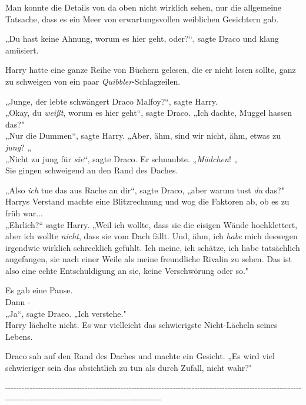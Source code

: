 {Man konnte die Details von da oben nicht wirklich sehen, nur die allgemeine Tatsache, dass es ein Meer von erwartungsvollen weiblichen Gesichtern gab.

„Du hast keine Ahnung, worum es hier geht, oder?“, sagte Draco und klang amüsiert.

Harry hatte eine ganze Reihe von Büchern gelesen, die er nicht lesen sollte, ganz zu schweigen von ein paar \emph{Quibbler}-Schlagzeilen.

„Junge, der lebte schwängert Draco Malfoy?“, sagte Harry.\\ „Okay, du \emph{weißt}, worum es hier geht“, sagte Draco. „Ich dachte, Muggel hassen das?"\\ „Nur die Dummen“, sagte Harry. „Aber, ähm, sind wir nicht, ähm, etwas zu \emph{jung}? „\\ „Nicht zu jung für \emph{sie}“, sagte Draco. Er schnaubte. „\emph{Mädchen}! „\\ Sie gingen schweigend an den Rand des Daches.

„Also \emph{ich} tue das aus Rache an dir“, sagte Draco, „aber warum tust \emph{du} das?"\\ Harrys Verstand machte eine Blitzrechnung und wog die Faktoren ab, ob es zu früh war...\\ „Ehrlich?“ sagte Harry. „Weil ich wollte, dass sie die eisigen Wände hochklettert, aber ich wollte \emph{nicht}, dass sie vom Dach fällt. Und, ähm, ich \emph{habe} mich deswegen irgendwie wirklich schrecklich gefühlt. Ich meine, ich schätze, ich habe tatsächlich angefangen, sie nach einer Weile als meine freundliche Rivalin zu sehen. Das ist also eine echte Entschuldigung an sie, keine Verschwörung oder so."

Es gab eine Pause.\\ Dann -\\ „Ja“, sagte Draco. „Ich verstehe."\\ Harry lächelte nicht. Es war vielleicht das schwierigste Nicht-Lächeln seines Lebens.

Draco sah auf den Rand des Daches und machte ein Gesicht. „Es wird viel schwieriger sein das absichtlich zu tun als durch Zufall, nicht wahr?"

-\/-\/-\/-\/-\/-\/-\/-\/-\/-\/-\/-\/-\/-\/-\/-\/-\/-\/-\/-\/-\/-\/-\/-\/-\/-\/-\/-\/-\/-\/-\/-\/-\/-\/-\/-\/-\/-\/-\/-\/-\/-\/-\/-\/-\/-\/-\/-\/-\/-\/-\/-\/-\/-\/-\/-\/-\/-\/-\/-\/-\/-\/-\/-\/-\/-\/-\/-\/-\/-\/-\/-\/-\/-\/-\/-\/-\/-\/-\/-\/-\/-\/-\/-\/-\/-\/-\/-\/-\/-\/-\/-\/-\/-\/-\/-\/-\/-\/-\/-\/-\/-\/-\/-\/-\/-\/-\/-\/-\/-\/-\/-\/-\/-\/-\/-\/-\/-\/-\/-\/-\/-\/-\/-\/-\/-\/-\/-\/-\/-\/-\/-\/-\/-\/-\/-\/-\/-\/-\/-\/-\/-\/-\/-\/-\/-\/-\/-\/-\/-\/-\/-\/-\/-\/-\/-\/-\/-\/-\/-\/-\/-\/-\/-\/-

}
